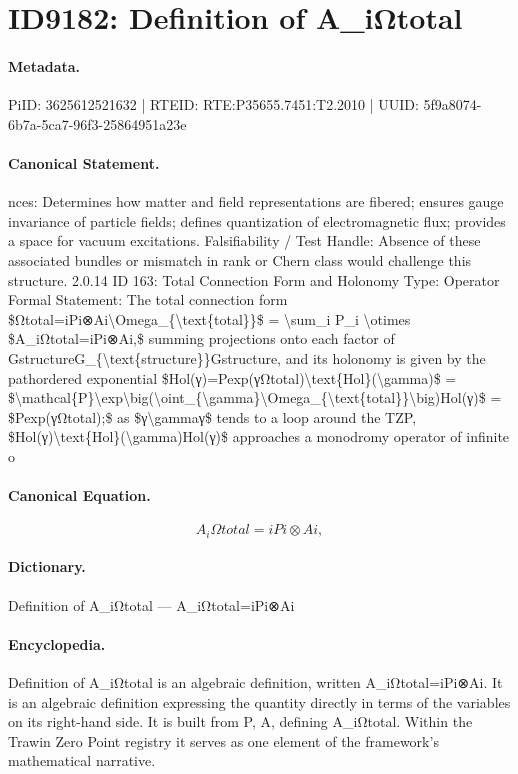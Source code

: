 \section*{ID9182: Definition of A\_iΩtotal}
\paragraph{Metadata.}
PiID: 3625612521632 | RTEID: RTE:P35655.7451:T2.2010 | UUID: 5f9a8074-6b7a-5ca7-96f3-25864951a23e

\paragraph{Canonical Statement.}
nces: Determines how matter and field representations are fibered; ensures gauge invariance of particle fields; defines quantization of electromagnetic flux; provides a space for vacuum excitations. Falsifiability / Test Handle: Absence of these associated bundles or mismatch in rank or Chern class would challenge this structure. 2.0.14 ID 163: Total Connection Form and Holonomy Type: Operator Formal Statement: The total connection form \$Ωtotal=iPi⊗Ai\textbackslash{}Omega\_\{\textbackslash{}text\{total\}\}\$ = \textbackslash{}sum\_i P\_i \textbackslash{}otimes \$A\_iΩtotal=iPi⊗Ai,\$ summing projections onto each factor of GstructureG\_\{\textbackslash{}text\{structure\}\}Gstructure, and its holonomy is given by the pathordered exponential \$Hol(γ)=Pexp(γΩtotal)\textbackslash{}text\{Hol\}(\textbackslash{}gamma)\$ = \$\textbackslash{}mathcal\{P\}\textbackslash{}exp\textbackslash{}big(\textbackslash{}oint\_\{\textbackslash{}gamma\}\textbackslash{}Omega\_\{\textbackslash{}text\{total\}\}\textbackslash{}big)Hol(γ)\$ = \$Pexp(γΩtotal);\$ as \$γ\textbackslash{}gammaγ\$ tends to a loop around the TZP, \$Hol(γ)\textbackslash{}text\{Hol\}(\textbackslash{}gamma)Hol(γ)\$ approaches a monodromy operator of infinite o

\paragraph{Canonical Equation.}
\[
A_iΩtotal=iPi⊗Ai,
\]

\paragraph{Dictionary.}
Definition of A\_iΩtotal — A\_iΩtotal=iPi⊗Ai

\paragraph{Encyclopedia.}
Definition of A\_iΩtotal is an algebraic definition, written A\_iΩtotal=iPi⊗Ai. It is an algebraic definition expressing the quantity directly in terms of the variables on its right-hand side. It is built from P, A, defining A\_iΩtotal. Within the Trawin Zero Point registry it serves as one element of the framework's mathematical narrative.
